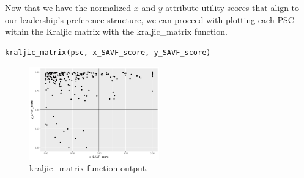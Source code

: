 \documentclass[twocolumn]{svjour3}       %
\begin{document}
Now that we have the normalized $x$ and $y$ attribute utility scores that align to our leadership's preference structure, we can proceed with plotting each PSC within the Kraljic matrix with the kraljic\_matrix function.
\begin{Verbatim}[fontsize=\footnotesize]
kraljic_matrix(psc, x_SAVF_score, y_SAVF_score)
\end{Verbatim}

\begin{figure}[!htb]
  \includegraphics[width=0.5\textwidth]{fig5.png}
  \caption{kraljic\_matrix function output.}
  \label{fig:5}
\end{figure}
\end{document}

